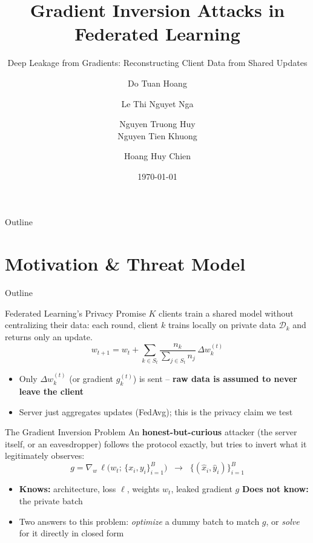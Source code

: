 \documentclass[aspectratio=169,xcolor=dvipsnames]{beamer}
\title{Gradient Inversion Attacks in Federated Learning}
\subtitle{Deep Leakage from Gradients: Reconstructing Client Data from Shared Updates}
\author[Hoang, Nga, Huy, Khuong, Chien]{Do Tuan Hoang \and Le Thi Nguyet Nga \and Nguyen Truong Huy\\Nguyen Tien Khuong \and Hoang Huy Chien}
\date{\today}
\begin{document}
\begin{frame}
\titlepage
\end{frame}

\begin{frame}{Outline}
\tableofcontents
\end{frame}


\section{Motivation \& Threat Model}

\begin{frame}{Outline}
\tableofcontents[currentsection]
\end{frame}


\begin{frame}{Federated Learning's Privacy Promise}
$K$ clients train a shared model without centralizing their data: each round, client
$k$ trains locally on private data $\mathcal{D}_k$ and returns only an update.
\[
w_{t+1} = w_t + \sum_{k \in S_t} \frac{n_k}{\sum_{j \in S_t} n_j} \, \Delta w_k^{(t)}
\]
\begin{itemize}
\item Only $\Delta w_k^{(t)}$ (or gradient $g_k^{(t)}$) is sent -- \textbf{raw data is
assumed to never leave the client}
\item Server just aggregates updates (FedAvg); this is the privacy claim we test
\end{itemize}
\end{frame}


\begin{frame}{The Gradient Inversion Problem}
An \textbf{honest-but-curious} attacker (the server itself, or an eavesdropper) follows
the protocol exactly, but tries to invert what it legitimately observes:
\[
g = \nabla_w \, \ell\big(w_t;\, \{x_i, y_i\}_{i=1}^{B}\big)
\;\;\longrightarrow\;\; \{(\hat{x}_i, \hat{y}_i)\}_{i=1}^{B}
\]
\begin{itemize}
\item \textbf{Knows:} architecture, loss $\ell$, weights $w_t$, leaked gradient $g$ \quad
\textbf{Does not know:} the private batch
\item Two answers to this problem: \emph{optimize} a dummy batch to match $g$, or
\emph{solve} for it directly in closed form
\end{itemize}
\end{frame}
\end{document}
